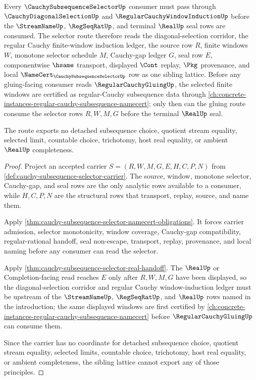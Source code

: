 \begin{theorem}
\label{thm:cauchy-subsequence-selector-sibling-lattice-route}
Every $\CauchySubsequenceSelectorUp$ consumer must pass through $\CauchyDiagonalSelectionUp$ and $\RegularCauchyWindowInductionUp$ before the $\StreamNameUp$, $\RegSeqRatUp$, and terminal $\RealUp$ seal rows are consumed. The selector route therefore reads the diagonal-selection corridor, the regular Cauchy finite-window induction ledger, the source row $R$, finite windows $W$, monotone selector schedule $M$, Cauchy-gap ledger $G$, seal row $E$, componentwise $\hsame$ transport, displayed $\Cont$ replay, $\Pkg$ provenance, and local $\NameCert_{\CauchySubsequenceSelectorUp}$ row as one sibling lattice. Before any gluing-facing consumer reads $\RegularCauchyGluingUp$, the selected finite windows are certified as regular-Cauchy subsequence data through \autoref{ch:concrete-instances-regular-cauchy-subsequence-namecert}; only then can the gluing route consume the selector rows $R,W,M,G$ before the terminal $\RealUp$ seal.

The route exports no detached subsequence choice, quotient stream equality, selected limit, countable choice, trichotomy, host real equality, or ambient $\RealUp$ completeness.
\end{theorem}
\begin{proof}
Project an accepted carrier $S=(R,W,M,G,E,H,C,P,N)$ from \autoref{def:cauchy-subsequence-selector-carrier}. The source, window, monotone selector, Cauchy-gap, and seal rows are the only analytic rows available to a consumer, while $H,C,P,N$ are the structural rows that transport, replay, source, and name them.

Apply \autoref{thm:cauchy-subsequence-selector-namecert-obligations}. It forces carrier admission, selector monotonicity, window coverage, Cauchy-gap compatibility, regular-rational handoff, seal non-escape, transport, replay, provenance, and local naming before any consumer can read the selector.

Apply \autoref{thm:cauchy-subsequence-selector-real-handoff}. The $\RealUp$ or Completion-facing read reaches $E$ only after $R,W,M,G$ have been displayed, so the diagonal-selection corridor and regular Cauchy window-induction ledger must be upstream of the $\StreamNameUp$, $\RegSeqRatUp$, and $\RealUp$ rows named in the introduction; the same displayed windows are first certified by \autoref{ch:concrete-instances-regular-cauchy-subsequence-namecert} before $\RegularCauchyGluingUp$ can consume them.

Since the carrier has no coordinate for detached subsequence choice, quotient stream equality, selected limits, countable choice, trichotomy, host real equality, or ambient completeness, the sibling lattice cannot export any of those principles.
\end{proof}

